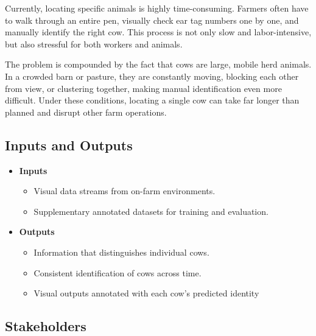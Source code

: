 \documentclass{article}
\begin{document}
    \setlength{\parskip}{0.6em} 

    Currently, locating specific animals is highly time-consuming. Farmers often 
    have to walk through an entire pen, visually check ear tag numbers one by one, 
    and manually identify the right cow. This process is not only slow and 
    labor-intensive, but also stressful for both workers and animals.

    \setlength{\parskip}{0.6em} 

    The problem is compounded by the fact that cows are large, mobile herd animals. 
    In a crowded barn or pasture, they are constantly moving, blocking each other 
    from view, or clustering together, making manual identification even more 
    difficult. Under these conditions, locating a single cow can take far longer 
    than planned and disrupt other farm operations. 


\subsection{Inputs and Outputs}


\begin{itemize}
    \item \textbf{Inputs}
          \begin{itemize}
                \item Visual data streams from on-farm environments.
                \item Supplementary annotated datasets for training and evaluation.
          \end{itemize}

    \item \textbf{Outputs}
          \begin{itemize}
              \item Information that distinguishes individual cows.
              \item Consistent identification of cows across time.
              \item Visual outputs annotated with each cow's predicted identity
          \end{itemize}
\end{itemize}




\subsection{Stakeholders}
\end{document}
